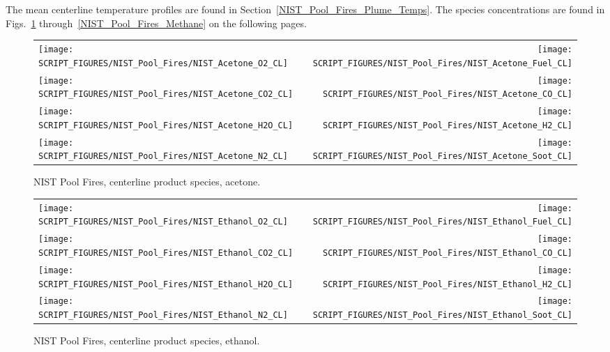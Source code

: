 The mean centerline temperature profiles are found in Section~\ref{NIST_Pool_Fires_Plume_Temps}. The species concentrations are found in Figs.~\ref{NIST_Pool_Fires_Acetone} through~\ref{NIST_Pool_Fires_Methane} on the following pages.

\begin{figure}[p]
\begin{tabular*}{\textwidth}{l@{\extracolsep{\fill}}r}
\texttt{[image: SCRIPT\_FIGURES/NIST\_Pool\_Fires/NIST\_Acetone\_O2\_CL]} &
\texttt{[image: SCRIPT\_FIGURES/NIST\_Pool\_Fires/NIST\_Acetone\_Fuel\_CL]} \\
\texttt{[image: SCRIPT\_FIGURES/NIST\_Pool\_Fires/NIST\_Acetone\_CO2\_CL]} &
\texttt{[image: SCRIPT\_FIGURES/NIST\_Pool\_Fires/NIST\_Acetone\_CO\_CL]}    \\
\texttt{[image: SCRIPT\_FIGURES/NIST\_Pool\_Fires/NIST\_Acetone\_H2O\_CL]} &
\texttt{[image: SCRIPT\_FIGURES/NIST\_Pool\_Fires/NIST\_Acetone\_H2\_CL]} \\
\texttt{[image: SCRIPT\_FIGURES/NIST\_Pool\_Fires/NIST\_Acetone\_N2\_CL]} &
\texttt{[image: SCRIPT\_FIGURES/NIST\_Pool\_Fires/NIST\_Acetone\_Soot\_CL]}
\end{tabular*}
\caption[NIST Pool Fires, centerline product species, acetone]{NIST Pool Fires, centerline product species, acetone.}
\label{NIST_Pool_Fires_Acetone}
\end{figure}

\begin{figure}[p]
\begin{tabular*}{\textwidth}{l@{\extracolsep{\fill}}r}
\texttt{[image: SCRIPT\_FIGURES/NIST\_Pool\_Fires/NIST\_Ethanol\_O2\_CL]} &
\texttt{[image: SCRIPT\_FIGURES/NIST\_Pool\_Fires/NIST\_Ethanol\_Fuel\_CL]} \\
\texttt{[image: SCRIPT\_FIGURES/NIST\_Pool\_Fires/NIST\_Ethanol\_CO2\_CL]} &
\texttt{[image: SCRIPT\_FIGURES/NIST\_Pool\_Fires/NIST\_Ethanol\_CO\_CL]}    \\
\texttt{[image: SCRIPT\_FIGURES/NIST\_Pool\_Fires/NIST\_Ethanol\_H2O\_CL]} &
\texttt{[image: SCRIPT\_FIGURES/NIST\_Pool\_Fires/NIST\_Ethanol\_H2\_CL]} \\
\texttt{[image: SCRIPT\_FIGURES/NIST\_Pool\_Fires/NIST\_Ethanol\_N2\_CL]} &
\texttt{[image: SCRIPT\_FIGURES/NIST\_Pool\_Fires/NIST\_Ethanol\_Soot\_CL]}
\end{tabular*}
\caption[NIST Pool Fires, centerline product species, ethanol]{NIST Pool Fires, centerline product species, ethanol.}
\label{NIST_Pool_Fires_Ethanol}
\end{figure}

